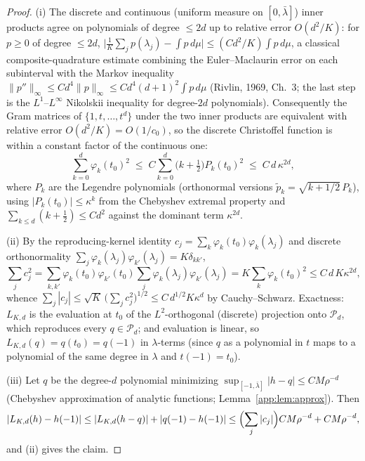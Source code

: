 \documentclass[11pt]{article}
\theoremstyle{plain}
\theoremstyle{definition}
\begin{document}
\begin{proof}
(i) The discrete and continuous (uniform measure on $[0,\bar\lambda]$)
inner products agree on polynomials of degree $\le 2d$ up to relative
error $O(d^2/K)$: for $p\ge0$ of degree $\le 2d$,
$\bigl|\frac1K\sum_jp(\lambda_j)-\int p\,d\mu\bigr|
\le (C d^2/K)\int p\,d\mu$,
a classical composite-quadrature estimate combining the
Euler--Maclaurin error on each subinterval with the Markov inequality
$\|p''\|_\infty\le C d^4\|p\|_\infty\le C d^4(d+1)^2\int p\,d\mu$
(Rivlin, 1969, Ch.~3; the last step is the $L^1$--$L^\infty$ Nikolskii
inequality for degree-$2d$ polynomials). Consequently the Gram matrices
of $\{1,t,\dots,t^d\}$ under the two inner products are equivalent with
relative error $O(d^2/K)=O(1/c_0)$, so the discrete Christoffel function
is within a constant factor of the continuous one:
\[
  \sum_{k=0}^{d}\varphi_k(t_0)^2
  \;\le\;C\sum_{k=0}^{d}\bigl(k+\tfrac12\bigr)P_k(t_0)^2
  \;\le\;C\,d\,\kappa^{2d},
\]
where $P_k$ are the Legendre polynomials (orthonormal versions
$\tilde p_k=\sqrt{k+1/2}\,P_k$), using $|P_k(t_0)|\le\kappa^k$ from the
Chebyshev extremal property and $\sum_{k\le d}(k+\tfrac12)\le C d^2$
against the dominant term $\kappa^{2d}$.

(ii) By the reproducing-kernel identity
$c_j=\sum_k\varphi_k(t_0)\varphi_k(\lambda_j)$ and discrete
orthonormality $\sum_j\varphi_k(\lambda_j)\varphi_{k'}(\lambda_j)
=K\delta_{kk'}$,
\[
  \sum_jc_j^2
  =\sum_{k,k'}\varphi_k(t_0)\varphi_{k'}(t_0)
   \textstyle\sum_j\varphi_k(\lambda_j)\varphi_{k'}(\lambda_j)
  =K\sum_k\varphi_k(t_0)^2
  \le C\,d\,K\kappa^{2d},
\]
whence $\sum_j|c_j|\le\sqrt K\,\bigl(\sum_jc_j^2\bigr)^{1/2}
\le C\,d^{1/2}K\kappa^{d}$ by Cauchy--Schwarz. Exactness: $L_{K,d}$ is
the evaluation at $t_0$ of the $L^2$-orthogonal (discrete) projection
onto $\mathcal P_d$, which reproduces every $q\in\mathcal P_d$; and
evaluation is linear, so $L_{K,d}(q)=q(t_0)=q(-1)$ in $\lambda$-terms
(since $q$ as a polynomial in $t$ maps to a polynomial of the same degree
in $\lambda$ and $t(-1)=t_0$).

(iii) Let $q$ be the degree-$d$ polynomial minimizing
$\sup_{[-1,\bar\lambda]}|h-q|\le CM\rho^{-d}$ (Chebyshev approximation of
analytic functions; Lemma~\ref{app:lem:approx}). Then
\[
  |L_{K,d}(h)-h(-1)|
  \le|L_{K,d}(h-q)|+|q(-1)-h(-1)|
  \le\Bigl(\sum_j|c_j|\Bigr)CM\rho^{-d}+CM\rho^{-d},
\]
and (ii) gives the claim.
\end{proof}
\end{document}
